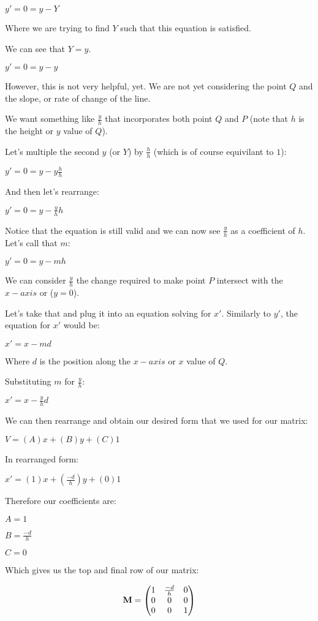 \documentclass[12pt]{article}
\begin{document}
$y' = 0 = y - Y$

Where we are trying to find $Y$ such that this equation is satisfied.

We can see that $Y = y$.

$y' = 0 = y - y$

However, this is not very helpful, yet.
We are not yet considering the point $Q$ and the slope, 
or rate of change of the line.

We want something like ${\frac{y}{h}}$ that incorporates both point $Q$ and $P$
(note that $h$ is the height or $y$ value of $Q$).

Let's multiple the second $y$ (or $Y$) by ${\frac{h}{h}}$ (which is of course equivilant to $1$):

$y' = 0 = y - y {\frac{h}{h}}$

And then let's rearrange:

$y' = 0 = y - {\frac{y}{h}} h$

Notice that the equation is still valid and we can now see ${\frac{y}{h}}$ as a coefficient of $h$.
Let's call that $m$:

$y' = 0 = y - m h$

We can consider ${\frac{y}{h}}$ the change required to make 
point $P$ intersect with the $x-axis$ or ($y = 0$).

Let's take that and plug it into an equation solving for $x'$.
Similarly to $y'$, the equation for $x'$ would be:

$x' = x - m d$

Where $d$ is the position along the $x-axis$ or $x$ value of $Q$.

Substituting $m$ for ${\frac{y}{h}}$:

$x' = x - {\frac{y}{h}} d$

We can then rearrange and obtain our desired form that we used for our matrix:

$V = (A)x + (B)y + (C)1$

In rearranged form:

$x' = (1)x + ({\frac{-d}{h}})y + (0)1$

Therefore our coefficients are:

$A = 1$

$B = {\frac{-d}{h}}$

$C = 0$

Which gives us the top and final row of our matrix:

\begin{align}
\textbf{M} &=
\begin{pmatrix}
1 & {\frac{-d}{h}} & 0 \\
0 & 0 & 0 \hfill \\
0 & 0 & 1 \hfill 
\end{pmatrix} \nonumber \\
\end{align}
\end{document}
